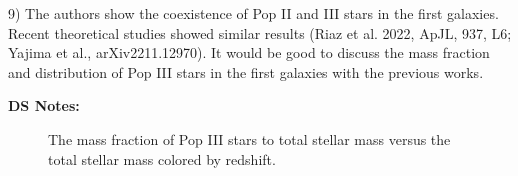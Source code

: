 \documentclass[11pt]{article}
\begin{document}
\begin{tcolorbox}[colback={lightgray}]
    9)      The authors show the coexistence of Pop II and III stars in the first galaxies. Recent theoretical studies showed similar results (Riaz et al. 2022, ApJL, 937, L6; Yajima et al., arXiv2211.12970). It would be good to discuss the mass fraction and distribution of Pop III stars in the first galaxies with the previous works. 
\end{tcolorbox}

\textbf{DS Notes:}
\begin{figure}[h]
    \centering
    \qquad
    \caption{The mass fraction of Pop III stars to total stellar mass versus the total stellar mass colored by redshift.}%
    \label{fig:ratio}%
\end{figure}
\end{document}
